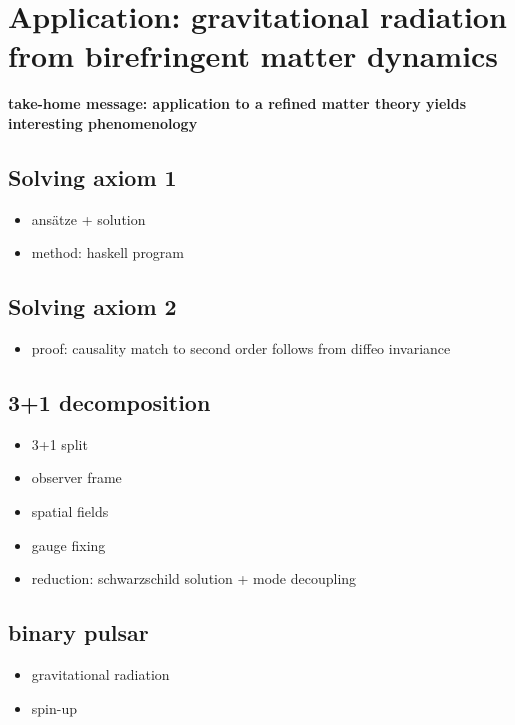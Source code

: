 \chapter{Application: gravitational radiation from birefringent matter dynamics}

\textbf{take-home message: application to a refined matter theory yields interesting phenomenology}

\section{Solving axiom 1}
\begin{itemize}
\item ansätze + solution
\item method: haskell program
\end{itemize}

\section{Solving axiom 2}
\begin{itemize}
\item proof: causality match to second order follows from diffeo invariance
\end{itemize}

\section{3+1 decomposition}
\begin{itemize}
\item 3+1 split
\item observer frame
\item spatial fields
\item gauge fixing
\item reduction: schwarzschild solution + mode decoupling
\end{itemize}

\section{binary pulsar}
\begin{itemize}
\item gravitational radiation
\item spin-up
\end{itemize}

